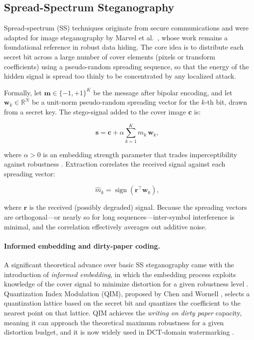 \documentclass[12pt,a4paper,oneside]{report}
\begin{document}
	\subsection{Spread-Spectrum Steganography}
	\label{subsec:spread_spectrum}
	
	Spread-spectrum (SS) techniques originate from secure communications and were adapted for
	image steganography by Marvel et al.\ \cite{marvel1999spread}, whose work remains a
	foundational reference in robust data hiding.
	The core idea is to distribute each secret bit across a large number of cover elements
	(pixels or transform coefficients) using a pseudo-random spreading sequence, so that
	the energy of the hidden signal is spread too thinly to be concentrated by any localized
	attack.
	
	Formally, let $\mathbf{m} \in \{-1,+1\}^K$ be the message after bipolar encoding,
	and let $\mathbf{w}_k \in \mathbb{R}^N$ be a unit-norm pseudo-random spreading vector
	for the $k$-th bit, drawn from a secret key.
	The stego-signal added to the cover image $\mathbf{c}$ is:
	
	\begin{equation}
		\mathbf{s} = \mathbf{c} + \alpha \sum_{k=1}^{K} m_k \, \mathbf{w}_k,
		\label{eq:ss_embed}
	\end{equation}
	
	where $\alpha > 0$ is an embedding strength parameter that trades imperceptibility
	against robustness \cite{marvel1999spread, cox2007}.
	Extraction correlates the received signal against each spreading vector:
	
	\begin{equation}
		\hat{m}_k = \operatorname{sign}\!\left(\mathbf{r}^{\top} \mathbf{w}_k\right),
		\label{eq:ss_extract}
	\end{equation}
	
	where $\mathbf{r}$ is the received (possibly degraded) signal.
	Because the spreading vectors are orthogonal—or nearly so for long sequences—inter-symbol
	interference is minimal, and the correlation effectively averages out additive noise.
	
	\paragraph{Informed embedding and dirty-paper coding.}
	A significant theoretical advance over basic SS steganography came with the introduction of
	\emph{informed embedding}, in which the embedding process exploits knowledge of the cover
	signal to minimize distortion for a given robustness level \cite{chen2001quantization}.
	Quantization Index Modulation (QIM), proposed by Chen and Wornell \cite{chen2001quantization}, selects
	a quantization lattice based on the secret bit and quantizes the coefficient to the nearest
	point on that lattice.
	QIM achieves the \emph{writing on dirty paper} capacity, meaning it can approach the
	theoretical maximum robustness for a given distortion budget, and it is now widely used
	in DCT-domain watermarking \cite{barni2001improved, proakis2008digital}.
	
\end{document}
